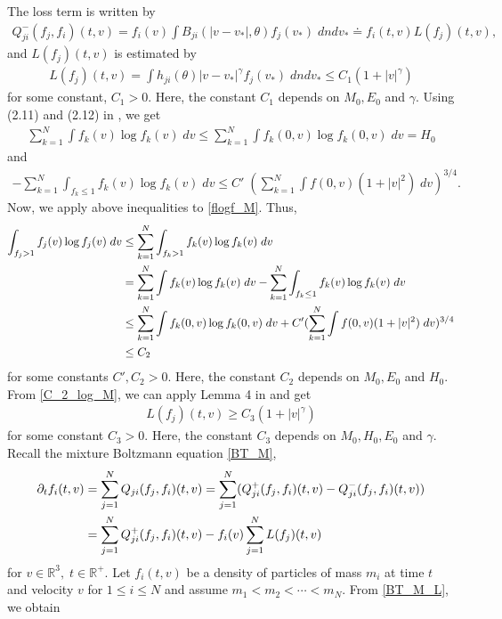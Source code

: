 \documentclass[reqno,10pt]{amsart}
\numberwithin{equation}{section}
\begin{document}
\noindent The loss term is written by 
\begin{align*}
    Q_{ji}^{-}(f_j,f_i)(t,v) = f_i(v)\int B_{ji}(|v-v_*|,\theta)f_j(v_*) \; dndv_* \doteq f_i(t,v) L(f_j)(t,v),
\end{align*}
and $L(f_j)(t,v)$ is estimated by  
\begin{align} \label{L_f_upper_I}
    L(f_j)(t,v) = \int h_{ji}(\theta)|v-v_*|^{\gamma}f_j(v_*) \; dn dv_* \leq C_1(1+|v|^{\gamma})
\end{align}
for some constant, $C_1>0.$ Here, the constant $C_1$ depends on $M_0, E_0$ and $\gamma$.
 Using (2.11) and (2.12) in \cite{AO2022}, we get
\begin{align*}
    \sum_{k=1}^{N} \int f_k(v) \log f_k(v) \; dv \leq \sum_{k=1}^{N} \int f_k(0,v) \log f_k(0,v) \; dv = H_0
\end{align*} and 
\begin{align*}
     - \sum_{k=1}^{N} \int_{f_k \leq 1} f_k(v) \log f_k(v) \; dv \leq C'\; (\sum_{k=1}^{N} \int f(0,v)(1+|v|^2)\; dv)^{3/4}.
\end{align*} Now, we apply above inequalities to \eqref{flogf_M}. Thus,
\begin{align}
    \int_{f_j >1} f_j(v) \log f_j(v) \; dv &\leq
    \sum_{k=1}^{N} \int_{f_k >1} f_k(v) \log f_k(v) \; dv \notag \\
    &= \sum_{k=1}^{N} \int f_k(v) \log f_k(v) \; dv
     - \sum_{k=1}^{N} \int_{f_k \leq 1} f_k(v) \log f_k(v) \; dv  \label{flogf_M} \\ 
    &\leq \sum_{k=1}^{N} \int f_k(0,v) \log f_k(0,v) \; dv + C' (\sum_{k=1}^{N} \int f(0,v)(1+|v|^2)\; dv)^{3/4} \notag \\
      &\leq C_2 \label{C_2_log_M}
\end{align}
for some constants $C', C_2>0.$ Here, the constant $C_2$ depends on $M_0,E_0$ and $H_0$.
From \eqref{C_2_log_M}, we can apply Lemma 4 in \cite{L1983} and get
\begin{align} \label{L_f_lower_I}
      L(f_j)(t,v) \geq C_3 (1+|v|^{\gamma}) 
\end{align} for some constant $C_3>0.$ Here, the constant $C_3$ depends on $M_0, H_0, E_0$ and $\gamma$.
Recall the mixture Boltzmann equation \eqref{BT_M}, 
\begin{align} 
    \partial_t f_i (t,v) &= \sum_{j=1}^{N} Q_{ji}(f_j,f_i) (t,v) \notag = \sum_{j=1}^{N}(Q_{ji}^{+}(f_j,f_i) (t,v)-Q_{ji}^{-}(f_j,f_i) (t,v)) \notag \\
    &= \sum_{j=1}^{N} Q_{ji}^{+}(f_j,f_i) (t,v) - f_i(v) \sum_{j=1}^{N} L(f_j)(t,v) \label{BT_M_L}
\end{align} for $v \in \mathbb{R}^3, \; t \in \mathbb{R^{+}}.$ Let $f_i(t,v)$ be a density of particles of mass $m_i$ at time $t$ and velocity $v$ for $1 \leq i \leq N$ and assume $m_1<m_2< \cdots < m_N.$ From \eqref{BT_M_L}, we obtain
\end{document}
